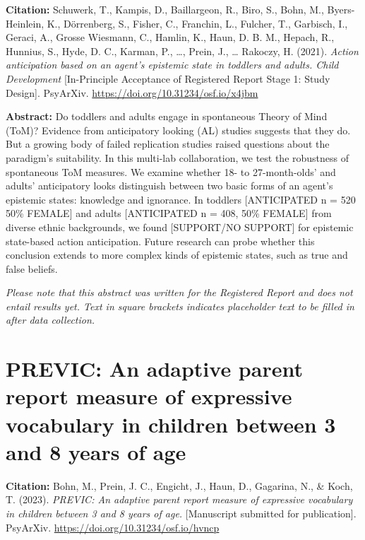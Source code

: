 \documentclass[
]{scrbook}
\begin{document}
\textbf{Citation:} Schuwerk, T., Kampis, D., Baillargeon, R., Biro, S., Bohn, M., Byers-Heinlein, K., Dörrenberg, S., Fisher, C., Franchin, L., Fulcher, T., Garbisch, I., Geraci, A., Grosse Wiesmann, C., Hamlin, K., Haun, D. B. M., Hepach, R., Hunnius, S., Hyde, D. C., Karman, P., \ldots, Prein, J., \ldots{} Rakoczy, H. (2021). \emph{Action anticipation based on an agent's epistemic state in toddlers and adults. Child Development} {[}In-Principle Acceptance of Registered Report Stage 1: Study Design{]}. PsyArXiv. \mbox{\url{https://doi.org/10.31234/osf.io/x4jbm}}

\textbf{Abstract:} Do toddlers and adults engage in spontaneous Theory of Mind (ToM)? Evidence from anticipatory looking (AL) studies suggests that they do. But a growing body of failed replication studies raised questions about the paradigm's suitability. In this multi-lab collaboration, we test the robustness of spontaneous ToM measures. We examine whether 18- to 27-month-olds' and adults' anticipatory looks distinguish between two basic forms of an agent's epistemic states: knowledge and ignorance. In toddlers {[}ANTICIPATED n = 520 50\% FEMALE{]} and adults {[}ANTICIPATED n = 408, 50\% FEMALE{]} from diverse ethnic backgrounds, we found {[}SUPPORT/NO SUPPORT{]} for epistemic state-based action anticipation. Future research can probe whether this conclusion extends to more complex kinds of epistemic states, such as true and false beliefs.

\emph{Please note that this abstract was written for the Registered Report and does not entail results yet. Text in square brackets indicates placeholder text to be filled in after data collection.}

\newpage

\section*{PREVIC: An adaptive parent report measure of expressive vocabulary in children between 3 and 8 years of age}\label{previc}

\textbf{Citation:} Bohn, M., Prein, J. C., Engicht, J., Haun, D., Gagarina, N., \& Koch, T. (2023). \emph{PREVIC: An adaptive parent report measure of expressive vocabulary in children between 3 and 8 years of age.} {[}Manuscript submitted for publication{]}. PsyArXiv. \mbox{\url{https://doi.org/10.31234/osf.io/hvncp}}
\end{document}
